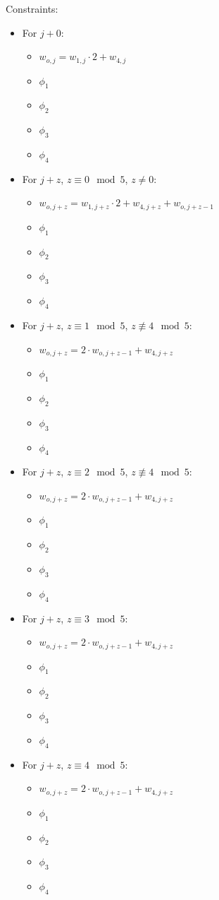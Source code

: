 Constraints:
\begin{itemize}
	\item For $j + 0$:
	\begin{itemize}
		\item $w_{o, j} = w_{1, j} \cdot 2 + w_{4, j}$
		\item $\phi_1$
		\item $\phi_2$
		\item $\phi_3$
		\item $\phi_4$
	\end{itemize}
	\item For $j + z$, $z \equiv 0 \mod 5$, $z \neq 0$:
	\begin{itemize}
		\item $w_{o, j + z} = w_{1, j + z} \cdot 2 + w_{4, j + z} + w_{o, j + z - 1}$
		\item $\phi_1$
		\item $\phi_2$
		\item $\phi_3$
		\item $\phi_4$
	\end{itemize}
	\item For $j + z$, $z \equiv 1 \mod 5$, $z \not\equiv 4 \mod 5$:
	\begin{itemize}
		\item $w_{o, j + z} = 2 \cdot w_{o, j + z - 1} + w_{4, j + z}$
		\item $\phi_1$
		\item $\phi_2$
		\item $\phi_3$
		\item $\phi_4$
	\end{itemize}
	\item For $j + z$, $z \equiv 2 \mod 5$, $z \not\equiv 4 \mod 5$:
	\begin{itemize}
		\item $w_{o, j + z} = 2 \cdot w_{o, j + z - 1} + w_{4, j + z}$
		\item $\phi_1$
		\item $\phi_2$
		\item $\phi_3$
		\item $\phi_4$
	\end{itemize}
	\item For $j + z$, $z \equiv 3 \mod 5$:
	\begin{itemize}
		\item $w_{o, j + z} = 2 \cdot w_{o, j + z - 1} + w_{4, j + z}$
		\item $\phi_1$
		\item $\phi_2$
		\item $\phi_3$
		\item $\phi_4$
	\end{itemize}
	\item For $j + z$, $z \equiv 4 \mod 5$:
	\begin{itemize}
		\item $w_{o, j + z} = 2 \cdot w_{o, j + z - 1} + w_{4, j + z}$
		\item $\phi_1$
		\item $\phi_2$
		\item $\phi_3$
		\item $\phi_4$
	\end{itemize}
\end{itemize}

